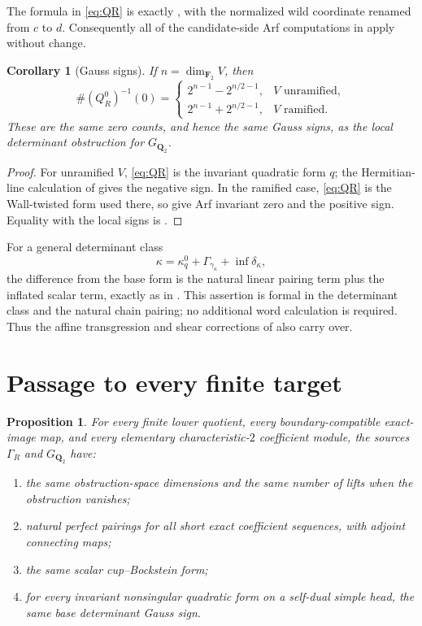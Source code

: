 \documentclass[11pt]{article}
\numberwithin{equation}{section}
\newtheorem{proposition}[theorem]{Proposition}
\newtheorem{corollary}[theorem]{Corollary}
\theoremstyle{definition}
\theoremstyle{remark}
\newcommand{\Q}{\mathbf Q}
\newcommand{\F}{\mathbf F}
\newcommand{\GQ}{G_{\Q_2}}
\newcommand{\GammaR}{\Gamma_R}
\begin{document}
The formula in \cref{eq:QR} is exactly \cite[(6.25)]{RT}, with the
normalized wild coordinate renamed from \(c\) to \(d\).  Consequently all
of the candidate-side Arf computations in \cite[\S6.2.1]{RT} apply without
change.

\begin{corollary}[Gauss signs]\label{cor:gauss}
If \(n=\dim_{\F_2}V\), then
\[
  \#(Q_R^0)^{-1}(0)=
  \begin{cases}
    2^{n-1}-2^{n/2-1},&V\text{ unramified},\\
    2^{n-1}+2^{n/2-1},&V\text{ ramified}.
  \end{cases}
\]
These are the same zero counts, and hence the same Gauss signs, as the
local determinant obstruction for \(\GQ\).
\end{corollary}

\begin{proof}
For unramified \(V\), \cref{eq:QR} is the invariant quadratic form \(q\);
the Hermitian-line calculation of \cite[Proposition~6.9]{RT} gives the
negative sign.  In the ramified case, \cref{eq:QR} is the Wall-twisted form
used there, so \cite[Lemmas~6.6 and~6.8]{RT} give Arf invariant zero and
the positive sign.  Equality with the local signs is
\cite[Proposition~6.18]{RT}.
\end{proof}

For a general determinant class
\[
  \kappa=\kappa_q^0+\Gamma_{\gamma_\kappa}+\operatorname{inf}\delta_\kappa,
\]
the difference from the base form is the natural linear pairing term plus
the inflated scalar term, exactly as in \cite[(6.7) and (6.27)]{RT}.
This assertion is formal in the determinant class and the natural chain
pairing; no additional word calculation is required.  Thus the affine
transgression and shear corrections of \cite[\S6.5]{RT} also carry over.

\section{Passage to every finite target}

\begin{proposition}\label{prop:interface}
For every finite lower quotient, every boundary-compatible exact-image map,
and every elementary characteristic-\(2\) coefficient module, the sources
\(\GammaR\) and \(\GQ\) have:
\begin{enumerate}
  \item the same obstruction-space dimensions and the same number of lifts
        when the obstruction vanishes;
  \item natural perfect pairings for all short exact coefficient
        sequences, with adjoint connecting maps;
  \item the same scalar cup--Bockstein form;
  \item for every invariant nonsingular quadratic form on a self-dual
        simple head, the same base determinant Gauss sign.
\end{enumerate}
\end{proposition}
\end{document}

